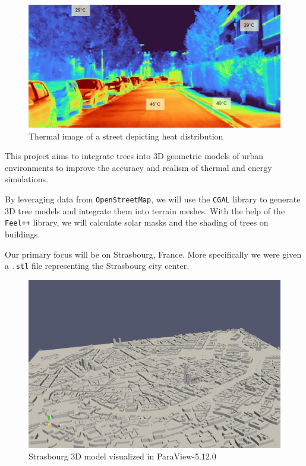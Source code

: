 \documentclass[12pt]{article}
\begin{document}
\begin{figure}[H]
    \centering
    \includegraphics[width=1\textwidth]{images/heat_street.png}
    \caption{Thermal image of a street depicting heat distribution \cite{img:street_thermography}}
\end{figure}

This project aims to integrate trees into 3D geometric models of urban
environments to improve the accuracy and realism of thermal and energy
simulations.

By leveraging data from \texttt{OpenStreetMap}\cite{openstreetmap}, we will use the
\texttt{CGAL}\cite{cgal} library to generate 3D tree models and integrate them into terrain
meshes.
With the help of the \texttt{Feel++}\cite{feel++} library, we will calculate solar masks and
the shading of trees on buildings.

Our primary focus will be on Strasbourg, France. More specifically we were given a
\texttt{.stl} file representing the Strasbourg city center.

\begin{figure}[H]
    \centering
    \includegraphics[width=1\textwidth]{images/stras_mesh.png}
    \caption{Strasbourg 3D model visualized in ParaView-5.12.0}
\end{figure}
\end{document}
